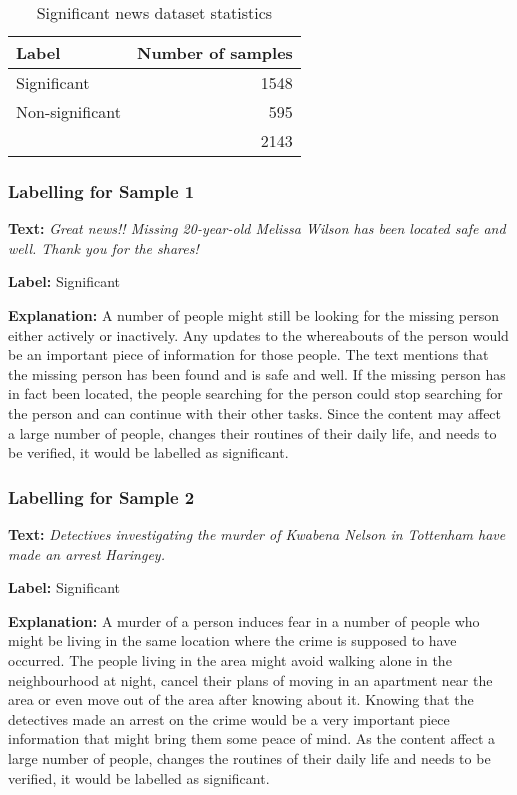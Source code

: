 \begin{table}[h]
\begin{center}
\caption{Significant news dataset statistics}
\label{tbl:dataset_statistics}
\begin{tabular}{lr}
\toprule 
Label&Number of samples\\
\midrule 
Significant&1548\\
Non-significant&595\\
\bottomrule
&2143 \\
\end{tabular}
\end{center}
\end{table}

\subsubsection{Labelling for Sample 1}
\textbf{Text:}
\textit{Great news!! Missing 20-year-old Melissa Wilson has been located safe and well. Thank you for the shares!}\par
\textbf{Label:} Significant\par
\textbf{Explanation:} A number of people might still be looking for the missing person either actively or inactively. Any updates to the whereabouts of the person would be an important piece of information for those people. The text mentions that the missing person has been found and is safe and well. If the missing person has in fact been located, the people searching for the person could stop searching for the person and can continue with their other tasks. Since the content may affect a large number of people, changes their routines of their daily life, and needs to be verified, it would be labelled as significant.

\subsubsection{Labelling for Sample 2}
\textbf{Text:}
\textit{Detectives investigating the murder of Kwabena Nelson in Tottenham have made an arrest Haringey.}\par
\textbf{Label:} Significant\par
\textbf{Explanation:} A murder of a person induces fear in a number of people who might be living in the same location where the crime is supposed to have occurred. The people living in the area might avoid walking alone in the neighbourhood at night, cancel their plans of moving in an apartment near the area or even move out of the area after knowing about it. Knowing that the detectives made an arrest on the crime would be a very important piece information that might bring them some peace of mind. As the content affect a large number of people, changes the routines of their daily life and needs to be verified, it would be labelled as significant.

